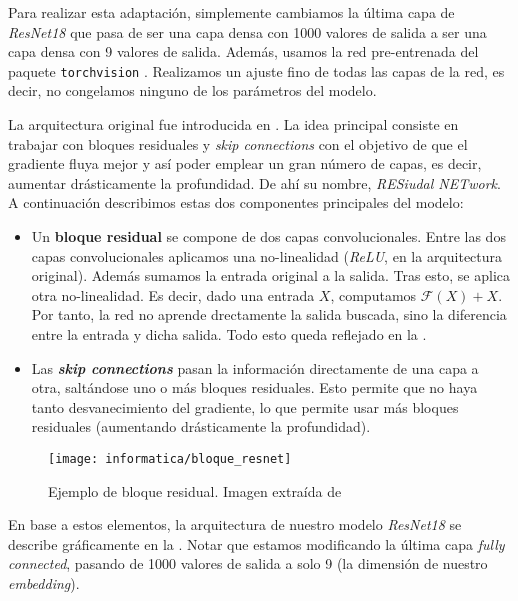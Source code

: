 Para realizar esta adaptación, simplemente cambiamos la última capa de \textit{ResNet18} que pasa de ser una capa densa con 1000 valores de salida a ser una capa densa con 9 valores de salida. Además, usamos la red pre-entrenada del paquete \lstinline{torchvision} \cite{informatica:resnet18_torchvision}. Realizamos un ajuste fino de todas las capas de la red, es decir, no congelamos ninguno de los parámetros del modelo.

La arquitectura original fue introducida en \cite{informatica:resnet_original_paper}. La idea principal consiste en trabajar con bloques residuales y \textit{skip connections} con el objetivo de que el gradiente fluya mejor y así poder emplear un gran número de capas, es decir, aumentar drásticamente la profundidad. De ahí su nombre, \textit{RESiudal NETwork}. A continuación describimos estas dos componentes principales del modelo:

\begin{itemize}
    \item Un \textbf{bloque residual} se compone de dos capas convolucionales. Entre las dos capas convolucionales aplicamos una no-linealidad (\textit{ReLU}, en la arquitectura original). Además sumamos la entrada original a la salida. Tras esto, se aplica otra no-linealidad. Es decir, dado una entrada $X$, computamos $\mathcal{F}(X) + X$. Por tanto, la red no aprende drectamente la salida buscada, sino la diferencia entre la entrada y dicha salida. Todo esto queda reflejado en la .
    \item Las \textbf{\textit{skip connections}} pasan la información directamente de una capa a otra, saltándose uno o más bloques residuales. Esto permite que no haya tanto desvanecimiento del gradiente, lo que permite usar más bloques residuales (aumentando drásticamente la profundidad).
\end{itemize}

\begin{figure}[hbt]
    \centering
    \texttt{[image: informatica/bloque\_resnet]}
    \caption{Ejemplo de bloque residual. Imagen extraída de \cite{informatica:resnet_original_paper}}
    \label{img:ejemplo_bloque_resnet}
\end{figure}

En base a estos elementos, la arquitectura de nuestro modelo \textit{ResNet18} se describe gráficamente en la . Notar que estamos modificando la última capa \textit{fully connected}, pasando de 1000 valores de salida a solo 9 (la dimensión de nuestro \textit{embedding}).

